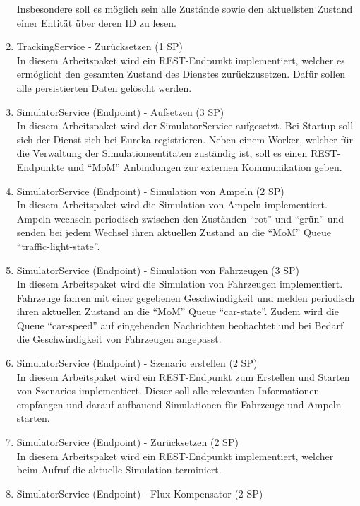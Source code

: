 \begin{enumerate}
  		Insbesondere soll es möglich sein alle Zustände sowie den aktuellsten Zustand einer Entität über deren ID zu lesen.
  \item TrackingService - Zurücksetzen (1 SP)\\
 		In diesem Arbeitspaket wird ein REST-Endpunkt implementiert, welcher es ermöglicht den gesamten Zustand des Dienstes zurückzusetzen.
 		Dafür sollen alle persistierten Daten gelöscht werden.
  \item SimulatorService (Endpoint) - Aufsetzen (3 SP)\\
  		In diesem Arbeitspaket wird der SimulatorService aufgesetzt.
  		Bei Startup soll sich der Dienst sich bei Eureka registrieren.
  		Neben einem Worker, welcher für die Verwaltung der Simulationsentitäten zuständig ist, soll es einen REST-Endpunkte und \enquote{MoM} Anbindungen zur externen Kommunikation geben.
  \item SimulatorService (Endpoint) - Simulation von Ampeln (2 SP)\\
  		In diesem Arbeitspaket wird die Simulation von Ampeln implementiert.
  		Ampeln wechseln periodisch zwischen den Zuständen \enquote{rot} und \enquote{grün} und senden bei jedem Wechsel ihren aktuellen Zustand an die \enquote{MoM} Queue \enquote{traffic-light-state}.
  \item SimulatorService (Endpoint) - Simulation von Fahrzeugen (3 SP)\\
  		In diesem Arbeitspaket wird die Simulation von Fahrzeugen implementiert.
  		Fahrzeuge fahren mit einer gegebenen Geschwindigkeit und melden periodisch ihren aktuellen Zustand an die \enquote{MoM} Queue \enquote{car-state}.
  		Zudem wird die Queue \enquote{car-speed} auf eingehenden Nachrichten beobachtet und bei Bedarf die Geschwindigkeit von Fahrzeugen angepasst.
  \item SimulatorService (Endpoint) - Szenario erstellen (2 SP)\\
  		In diesem Arbeitspaket wird ein REST-Endpunkt zum Erstellen und Starten von Szenarios implementiert.
  		Dieser soll alle relevanten Informationen empfangen und darauf aufbauend Simulationen für Fahrzeuge und Ampeln starten.
  \item SimulatorService (Endpoint) - Zurücksetzen (2 SP)\\
  		In diesem Arbeitspaket wird ein REST-Endpunkt implementiert, welcher beim Aufruf die aktuelle Simulation terminiert.
  \item SimulatorService (Endpoint) - Flux Kompensator (2 SP)\\

\end{enumerate}
